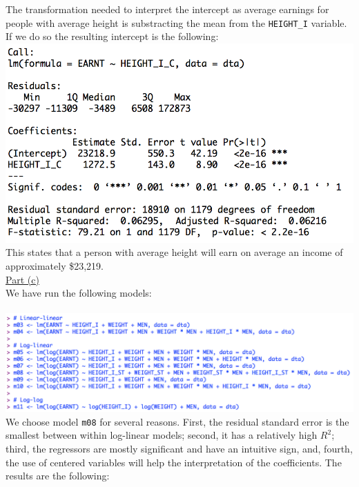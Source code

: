 \documentclass[a4paper, 11pt]{article}
\begin{document}
\newline The transformation needed to interpret the intercept as average earnings for people with average height is substracting the mean from the \texttt{HEIGHT\_I} variable. If we do so the resulting intercept is the following:\\
\includegraphics[scale=0.7]{reg2.png}
\newline This states that a person with average height will earn on average an income of approximately \$23,219.\\
\newline \underline{Part (c)}\\
\newline We have run the following models:\\
\newline \\
\includegraphics[scale=0.6]{reg3.png}
\newline \\
\newline We choose model \texttt{m08} for several reasons. First, the residual standard error is the smallest between within log-linear models; second, it has a relatively high $R^2$; third, the regressors are mostly significant and have an intuitive sign, and, fourth, the use of centered variables will help the interpretation of the coefficients. The results are the following:\\
\newline \\
\end{document}
